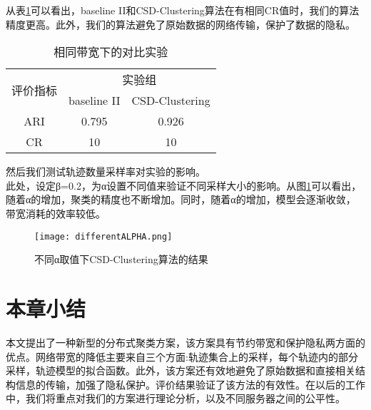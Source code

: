 从表\ref{sameDK}可以看出，baseline II和CSD-Clustering算法在有相同CR值时，我们的算法精度更高。此外，我们的算法避免了原始数据的网络传输，保护了数据的隐私。
\begin{table}[]
\label{sameDK}
\caption{相同带宽下的对比实验}
\begin{tabular}{|c|c|c|}
\hline
\multirow{2}{*}{评价指标} & \multicolumn{2}{c|}{实验组}     \\ \cline{2-3} 
                      & baseline II & CSD-Clustering \\ \hline
ARI                   & 0.795       & 0.926          \\ \hline
CR                    & 10          & 10             \\ \hline
\end{tabular}
\end{table}

然后我们测试轨迹数量采样率对实验的影响。\\
此处，设定β=0.2，为α设置不同值来验证不同采样大小的影响。从图\ref{differentALPHA}可以看出，随着α的增加，聚类的精度也不断增加。同时，随着α的增加，模型会逐渐收敛，带宽消耗的效率较低。\\

\begin{figure}[h]
	\texttt{[image: differentALPHA.png]}
	\caption{不同α取值下CSD-Clustering算法的结果}
	\label{differentALPHA}
\end{figure}

\section{本章小结}
本文提出了一种新型的分布式聚类方案，该方案具有节约带宽和保护隐私两方面的优点。网络带宽的降低主要来自三个方面:轨迹集合上的采样，每个轨迹内的部分采样，轨迹模型的拟合函数。此外，该方案还有效地避免了原始数据和直接相关结构信息的传输，加强了隐私保护。评价结果验证了该方法的有效性。在以后的工作中，我们将重点对我们的方案进行理论分析，以及不同服务器之间的公平性。